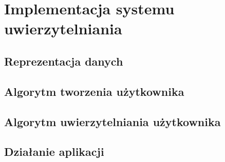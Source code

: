 
\chapter{Implementacja systemu uwierzytelniania}
\section{Reprezentacja danych}
\section{Algorytm tworzenia użytkownika}
\section{Algorytm uwierzytelniania użytkownika}
\section{Działanie aplikacji}